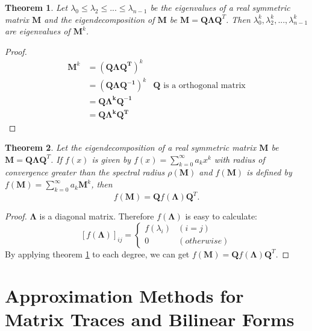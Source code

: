 \documentclass[senior,final,11pt]{iscs-thesis}
\newtheorem{theorem}{Theorem}
\begin{document}
\begin{theorem}
    \label{power_eigenvalues}
    Let $\lambda_0 \leq \lambda_2 \leq ... \leq \lambda_{n-1}$ be the eigenvalues of a real symmetric matrix $\mathbf{M}$ and the eigendecomposition of $\mathbf{M}$ be $\mathbf{M}=\mathbf{Q}\mathbf{\Lambda}\mathbf{Q}^T$. Then $\lambda_0^k, \lambda_2^k, ..., \lambda_{n-1}^k$ are eigenvalues of $\mathbf{M}^k$.
\end{theorem}
\begin{proof}
    \begin{align*}
        \mathbf{M}^k &= (\mathbf{\mathbf{Q}\mathbf{\Lambda}\mathbf{Q}^T})^k \\
        &= (\mathbf{\mathbf{Q}\mathbf{\Lambda}\mathbf{Q}^{-1}})^k &\text{$\mathbf{Q}$ is a orthogonal matrix}\\
        &= \mathbf{\mathbf{Q}\mathbf{\Lambda}^k\mathbf{Q}^{-1}}\\
        &= \mathbf{\mathbf{Q}\mathbf{\Lambda}^k\mathbf{Q}^T}
    \end{align*}
\end{proof}

\begin{theorem}
    Let the eigendecomposition of a real symmetric matrix $\mathbf{M}$ be $\mathbf{M}=\mathbf{Q}\mathbf{\Lambda}\mathbf{Q}^T$. If $f(x)$ is given by $f(x)=\sum_{k=0}^{\infty} a_k x^k$ with radius of convergence greater than the spectral radius $\rho(\mathbf{M})$ and $f(\mathbf{M})$ is defined by $f(\mathbf{M})=\sum_{k=0}^{\infty} a_k \mathbf{M}^k$, then
    \[f(\mathbf{M}) = \mathbf{Q}f(\mathbf{\Lambda})\mathbf{Q}^T.\]
\end{theorem}
\begin{proof}
    $\mathbf{\Lambda}$ is a diagonal matrix. Therefore $f(\mathbf{\Lambda})$ is easy to calculate:
    \[
    [f(\mathbf{\Lambda})]_{ij} = \begin{cases}
        f(\lambda_i) & (i=j) \\
        0 & (otherwise)
        \end{cases}
    \]
    By applying theorem \ref{power_eigenvalues} to each degree, we can get $f(\mathbf{M}) = \mathbf{Q}f(\mathbf{\Lambda})\mathbf{Q}^T$.
\end{proof}

\section{Approximation Methods for Matrix Traces and Bilinear Forms}
\end{document}
